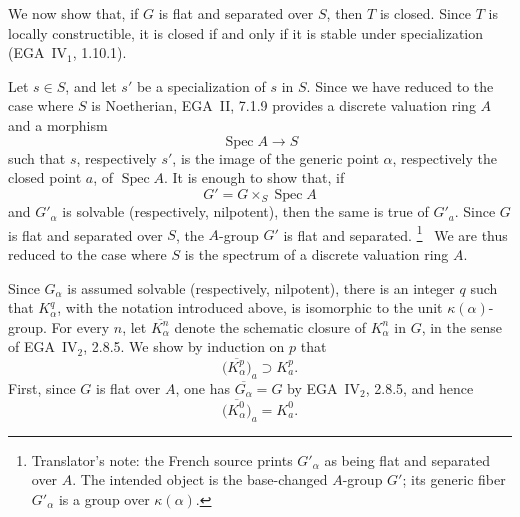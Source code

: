 We now show that, if \(G\) is flat and separated over \(S\),
then \(T\) is closed. Since \(T\) is locally
constructible, it is closed if and only if it is stable under
specialization (EGA~IV\(_1\), 1.10.1).

Let \(s\in S\), and let \(s'\) be a specialization of \(s\)
in \(S\). Since we have reduced to the case where \(S\) is
Noetherian, EGA~II, 7.1.9 provides a discrete valuation ring
\(A\) and a morphism
\[
  \operatorname{Spec}A\longrightarrow S
\]
such that \(s\), respectively \(s'\), is the image of the
generic point \(\alpha\), respectively the closed point \(a\),
of \(\operatorname{Spec}A\). It is enough to show that, if
\[
  G'=G\times_S\operatorname{Spec}A
\]
and \(G'_\alpha\) is solvable (respectively, nilpotent), then
the same is true of \(G'_a\). Since \(G\) is flat and
separated over \(S\), the \(A\)-group \(G'\) is flat and
separated.%
\begingroup
\renewcommand{\thefootnote}{\fnsymbol{footnote}}%
\footnote[3]{\label{note:sga3-VIB-8.4-Gprime-alpha}
Translator's note: the French source prints \(G'_\alpha\) as
being flat and separated over \(A\). The intended object is
the base-changed \(A\)-group \(G'\); its generic fiber
\(G'_\alpha\) is a group over \(\kappa(\alpha)\).}%
\endgroup\ 
We are thus reduced to the case where \(S\) is the spectrum of
a discrete valuation ring \(A\).

Since \(G_\alpha\) is assumed solvable (respectively,
nilpotent), there is an integer \(q\) such that
\(K_\alpha^q\), with the notation introduced above, is
isomorphic to the unit \(\kappa(\alpha)\)-group. For every
\(n\), let \(\overline{K_\alpha^n}\) denote the schematic
closure of \(K_\alpha^n\) in \(G\), in the sense of
EGA~IV\(_2\), 2.8.5. We show by induction on \(p\) that
\label{form:sga3-VIB-8.4-closure-induction}%
\[
  \bigl(\overline{K_\alpha^p}\bigr)_a
    \supset K_a^p.
\]
First, since \(G\) is flat over \(A\), one has
\(\overline{G_\alpha}=G\) by EGA~IV\(_2\), 2.8.5, and hence
\[
  \bigl(\overline{K_\alpha^0}\bigr)_a=K_a^0.
\]

